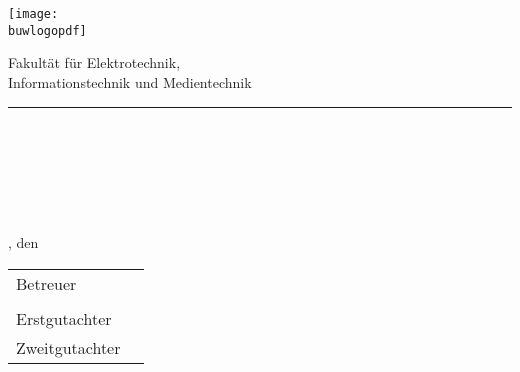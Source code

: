 	\begin{titlepage}
		\sffamily%
		\hspace{-1.5em}%
		\texttt{[image: \\buwlogopdf]}%
		\hfill%
		\begin{minipage}[b]{\linewidth-4.5cm}
			\begin{flushright}
				\normalsize{Fakultät für Elektrotechnik,}%
				\\\vspace{0.2mm}
				\normalsize{Informationstechnik und Medientechnik}%
				\vspace*{0.05mm}
			\end{flushright}
		\end{minipage}
		\vspace{-0.3em}
		\begingroup%
			\color{primary}%
			\rule{\textwidth}{3pt}%
		\endgroup%
		\begin{flushright}
			\lehrstuhl
		\end{flushright}
		
		\vspace{3.2em}
		\begin{center}
			\textbf{\Huge \artderarbeit}%
			\vspace{1.4em}
			\\
			\textbf{\large{\thema}}%
		\end{center}
		
		
		\vfill
	
	
		\begin{center}
			\Large
			\autor%
			\\
			{\Large\matrikelnummer}%
			\bigskip\\%
			\studiengang%
			\\
			{\large\schwerpunkt}%
			\vspace{2em}%
			\hspace{0em}\\%
			\normalsize%
			\ort, den \abgabedatum%
		\end{center}
		
		
		\vfill
		
		\begin{tabular}{ll}
			Betreuer       & \betreuer \\
			               &           \\
			Erstgutachter  & \prueferA \\
			Zweitgutachter & \prueferB
		\end{tabular}
	\end{titlepage}
